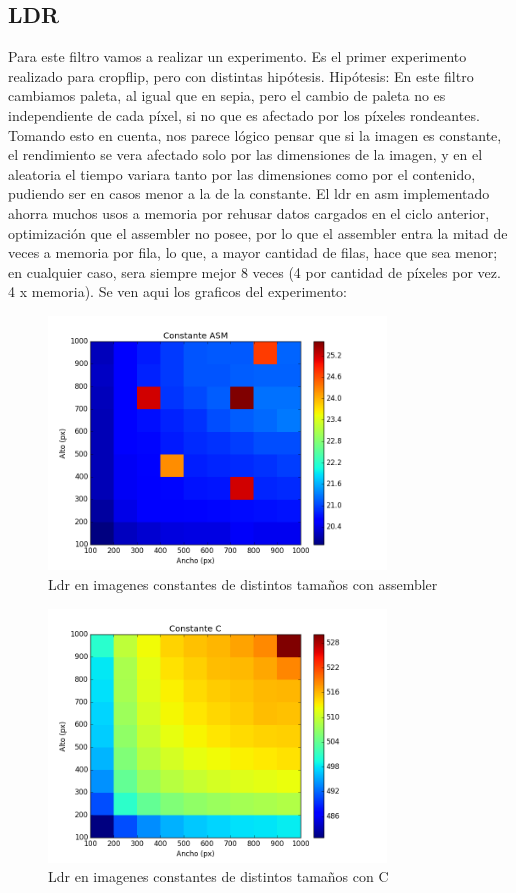 \subsection{LDR}
\hfill \break
Para este filtro vamos a realizar un experimento. Es el primer  experimento realizado para cropflip, pero con distintas hipótesis.
\hfill \break
Hipótesis: En este filtro cambiamos paleta, al igual que en sepia, pero el cambio de paleta no es independiente de cada píxel, si no que es afectado por los píxeles rondeantes. Tomando esto en cuenta, nos parece lógico pensar que si la imagen es constante, el rendimiento se vera afectado solo por las dimensiones de la imagen, y en el aleatoria el tiempo variara tanto por las dimensiones como por el contenido, pudiendo ser en casos menor a la de la constante. El ldr en asm implementado ahorra muchos usos a memoria por rehusar datos cargados en el ciclo anterior, optimización que el assembler no posee, por lo que el assembler entra la mitad de veces a memoria por fila, lo que, a mayor cantidad de filas, hace que sea menor; en cualquier caso, sera siempre mejor 8 veces (4 por cantidad de píxeles por vez. 4 x memoria). 
Se ven aqui los graficos del experimento:


 \begin{figure} [H]
  \centering
  \includegraphics[width=0.8\textwidth]{recursos/constanteldrasm.png}
    \caption{ Ldr en imagenes constantes de distintos tamaños con assembler }
\end{figure}
 
 \begin{figure} [H]
  \centering
  \includegraphics[width=0.8\textwidth]{recursos/constanteldrc.png}
    \caption{ Ldr en imagenes constantes de distintos tamaños con C }
\end{figure}
 
